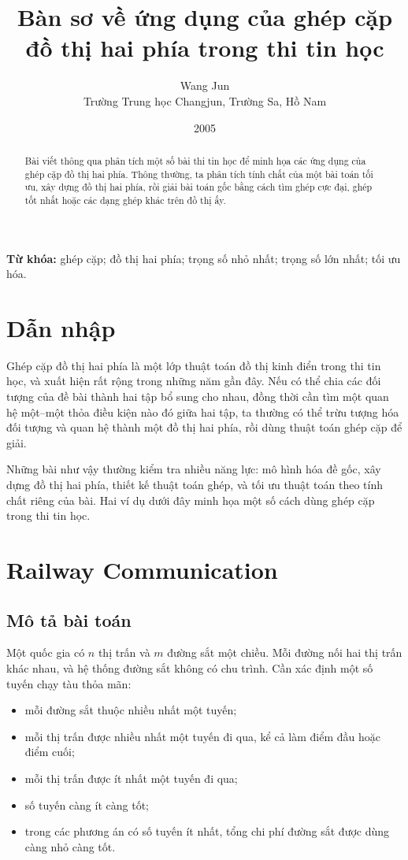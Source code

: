 \documentclass[11pt]{article}
\title{Bàn sơ về ứng dụng của ghép cặp đồ thị hai phía trong thi tin học}
\author{Wang Jun\\Trường Trung học Changjun, Trường Sa, Hồ Nam}
\date{2005}
\begin{document}
\maketitle


\renewcommand{\abstractname}{Tóm tắt}
\begin{abstract}
Bài viết thông qua phân tích một số bài thi tin học để minh họa các ứng dụng
của ghép cặp đồ thị hai phía. Thông thường, ta phân tích tính chất của một bài
toán tối ưu, xây dựng đồ thị hai phía, rồi giải bài toán gốc bằng cách tìm
ghép cực đại, ghép tốt nhất hoặc các dạng ghép khác trên đồ thị ấy.
\end{abstract}

\noindent\textbf{Từ khóa:} ghép cặp; đồ thị hai phía; trọng số nhỏ nhất; trọng
số lớn nhất; tối ưu hóa.

\section{Dẫn nhập}

Ghép cặp đồ thị hai phía là một lớp thuật toán đồ thị kinh điển trong thi tin
học, và xuất hiện rất rộng trong những năm gần đây. Nếu có thể chia các đối
tượng của đề bài thành hai tập bổ sung cho nhau, đồng thời cần tìm một quan
hệ một--một thỏa điều kiện nào đó giữa hai tập, ta thường có thể trừu tượng
hóa đối tượng và quan hệ thành một đồ thị hai phía, rồi dùng thuật toán ghép
cặp để giải.

Những bài như vậy thường kiểm tra nhiều năng lực: mô hình hóa đề gốc, xây
dựng đồ thị hai phía, thiết kế thuật toán ghép, và tối ưu thuật toán theo tính
chất riêng của bài. Hai ví dụ dưới đây minh họa một số cách dùng ghép cặp
trong thi tin học.

\section{Railway Communication}

\subsection{Mô tả bài toán}

Một quốc gia có $n$ thị trấn và $m$ đường sắt một chiều. Mỗi đường nối hai thị
trấn khác nhau, và hệ thống đường sắt không có chu trình. Cần xác định một số
tuyến chạy tàu thỏa mãn:
\begin{itemize}
  \item mỗi đường sắt thuộc nhiều nhất một tuyến;
  \item mỗi thị trấn được nhiều nhất một tuyến đi qua, kể cả làm điểm đầu hoặc
  điểm cuối;
  \item mỗi thị trấn được ít nhất một tuyến đi qua;
  \item số tuyến càng ít càng tốt;
  \item trong các phương án có số tuyến ít nhất, tổng chi phí đường sắt được
  dùng càng nhỏ càng tốt.
\end{itemize}
\end{document}
